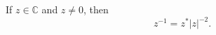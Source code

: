 If $z \in \mathbb{C}$ and $z \neq 0$, then
\begin{equation*}
z^{-1} = z^* |z|^{-2}.
\end{equation*}
